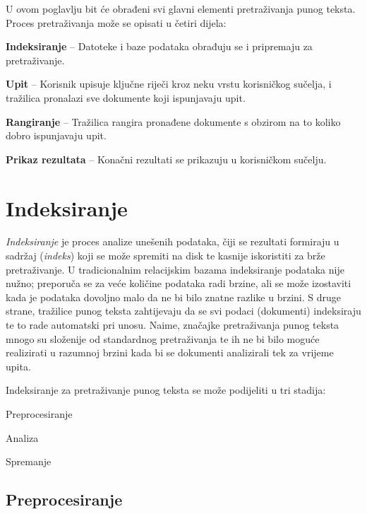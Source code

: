 \documentclass[a4paper,twoside,12pt]{scrreprt}
\begin{document}
U ovom poglavlju bit će obrađeni svi glavni elementi pretraživanja punog teksta. Proces pretraživanja može se opisati u četiri dijela:

\begin{compactenum}
  \item \textbf{Indeksiranje} – Datoteke i baze podataka obrađuju se i pripremaju za pretraživanje.
  \item \textbf{Upit} – Korisnik upisuje ključne riječi kroz neku vrstu korisničkog sučelja, i tražilica pronalazi sve dokumente koji ispunjavaju upit.
  \item \textbf{Rangiranje} – Tražilica rangira pronađene dokumente s obzirom na to koliko dobro ispunjavaju upit.
  \item \textbf{Prikaz rezultata} – Konačni rezultati se prikazuju u korisničkom sučelju.
\end{compactenum}

\section{Indeksiranje}
\label{indexing}

\textit{Indeksiranje} je proces analize unešenih podataka, čiji se rezultati formiraju u sadržaj (\textit{indeks}) koji se može spremiti na disk te kasnije iskoristiti za brže pretraživanje. U tradicionalnim relacijskim bazama indeksiranje podataka nije nužno; preporuča se za veće količine podataka radi brzine, ali se može izostaviti kada je podataka dovoljno malo da ne bi bilo znatne razlike u brzini. S druge strane, tražilice punog teksta zahtijevaju da se svi podaci (dokumenti) indeksiraju te to rade automatski pri unosu. Naime, značajke pretraživanja punog teksta mnogo su složenije od standardnog pretraživanja te ih ne bi bilo moguće realizirati u razumnoj brzini kada bi se dokumenti analizirali tek za vrijeme upita.

Indeksiranje za pretraživanje punog teksta se može podijeliti u tri stadija:

\begin{compactenum}
  \item Preprocesiranje
  \item Analiza
  \item Spremanje
\end{compactenum}

\subsection{Preprocesiranje}
\end{document}
